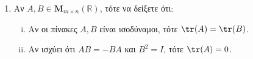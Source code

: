 \begin{enumerate}
  \item Αν $ A,B \in \textbf{M}_{m \times n}(\mathbb{R}) $, τότε να δείξετε ότι:
    \begin{enumerate}[i)]
      \item Αν οι πίνακες $ A,B $ είναι ισοδύναμοι, τότε $ \tr(A)=\tr(B) $.
      \item Αν ισχύει ότι $ AB=-BA $ και $ B^{2}=I $, τότε $ \tr(A)=0 $.
    \end{enumerate}
\end{enumerate}






